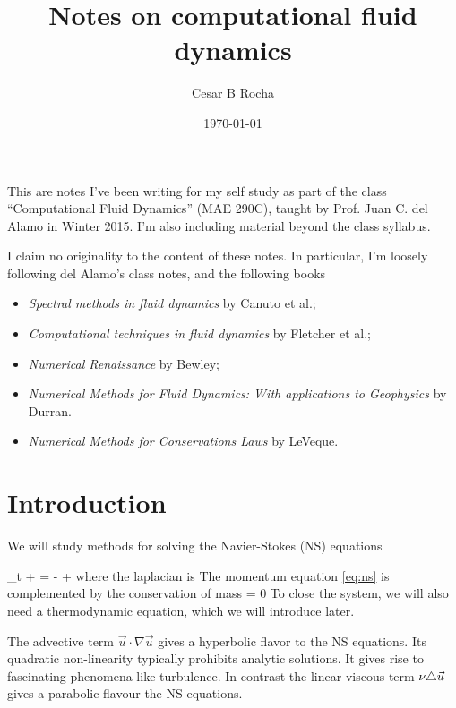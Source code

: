 \documentclass[11pt]{article}
\title{Notes on computational fluid dynamics}
\author{Cesar B Rocha}
\date{\today}
\begin{document}


\maketitle

This are notes I've been writing for my self study as part of the class ``Computational Fluid Dynamics'' (MAE 290C), taught by Prof. Juan C. del Alamo in Winter 2015. I'm also including material beyond the class syllabus.


I claim no originality to the content of these notes.  In particular, I'm loosely following del Alamo's class notes, and the following books

\begin{itemize}

    \item \textit{Spectral methods in fluid dynamics} by Canuto et al.;

    \item \textit{Computational techniques in fluid dynamics} by Fletcher et al.;

    \item \textit{Numerical Renaissance} by Bewley;

    \item \textit{Numerical Methods for Fluid Dynamics: With applications 
        to Geophysics} by Durran.

    \item \textit{Numerical Methods for Conservations Laws} by LeVeque.

\end{itemize}

\section{Introduction}
We will study methods for solving  the Navier-Stokes (NS) equations

\beq
\label{eq:ns}
\p_t  + \cdot \nabla {} = - + \nu \lap {}\com
\eeq
where the laplacian is
\beq
\label{eq:lap_defn}
\lap {} \nabla \cdot \nabla
\eeq
The momentum equation \eqref{eq:ns} is complemented by the conservation of mass
\beq
\label{eq:cons_mass}
\nabla\cdot{} = 0\per
\eeq
To close the system, we will also need a thermodynamic equation, which we will introduce later.

The advective term $\vec{u}\cdot\nabla\vec{u}$ gives a hyperbolic flavor to the NS equations. Its quadratic non-linearity typically prohibits analytic solutions. It gives rise to fascinating phenomena like turbulence. In contrast the linear viscous term $\nu\triangle\vec{u}$ gives a parabolic flavour the NS equations.
\end{document}
